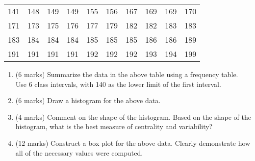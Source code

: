\documentclass[]{article}
\begin{document}
\begin{table}[ht]
\begin{center}
\begin{tabular}{|rrrrrrrrrr|}

\hline
141 & 148 & 149 & 149 & 155 & 156 & 167 & 169 & 169 & 170 \\
171 & 173 & 175 & 176 & 177 & 179 & 182 & 182 & 183 & 183 \\
183 & 184 & 184 & 184 & 185 & 185 & 185 & 186 & 186 & 189 \\
191 & 191 & 191 & 191 & 192 & 192 & 192 & 193 & 194 & 199 \\
\hline
\end{tabular}
\end{center}
\end{table}
\vspace{-0.5cm}
\begin{enumerate}
\item (6 marks) Summarize the data in the above table using a frequency table. Use 6 class intervals, with 140 as the lower limit of the first interval.
\item (6 marks) Draw a histogram for the above data.
\item (4 marks) Comment on the shape of the histogram. Based on the shape of the histogram, what is the best measure of centrality and variability?
\item (12 marks) Construct a box plot for the above data. Clearly demonstrate how all of the necessary values were computed.
\end{enumerate}
\end{document}
